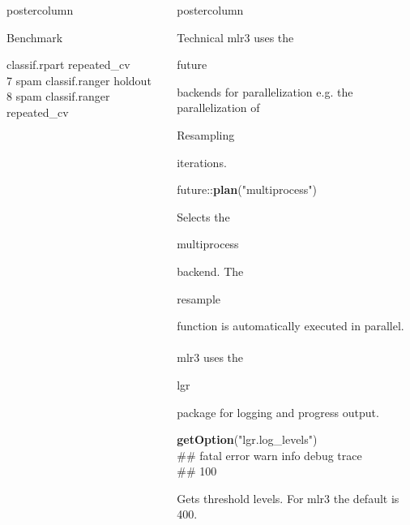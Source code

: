 \documentclass{beamer}
\newlength{\columnheight} %
\newcommand{\codeinline}[1]{\begin{codeboxinline}#1\end{codeboxinline}}
\begin{document}
\begin{withoutheader}
\begin{frame}[fragile]{}
\begin{columns}
\begin{column}{.245\textwidth}
\begin{beamercolorbox}[center]{postercolumn}
\begin{minipage}{.98\textwidth}
{\begin{myblock}{Benchmark}
\begin{codeboxmultiline}[width=27cm]
{								\space  classif.rpart
								\space\space repeated\_cv
								\space{}
								\space\space\space\space\space\space\space 0
								\space\space\space\space{}\\
								7 \space\space\space\space spam
								classif.ranger
								\space\space\space\space\space\space holdout
								\space\space\space\space 1
								\space\space\space\space\space\space{}
								\space\space\space\space\space 0\\
								8 \space\space\space\space spam
								classif.ranger
								\space\space repeated\_cv
								\space{}00
								\space\space\space\space\space\space{}
								\space\space\space\space{}
							}
						\end{codeboxmultiline}
					\end{myblock}
					\vfill
					}
				\end{minipage}
			\end{beamercolorbox}
		\end{column}
		\begin{column}{.245\textwidth}
			\begin{beamercolorbox}[center]{postercolumn}
				\begin{minipage}{.98\textwidth}
					\parbox[t][\columnheight]{\textwidth}{
						\begin{myblock}{Technical}
							{mlr3} uses the \codeinline{future} backends for parallelization e.g. the parallelization of \codeinline{Resampling} iterations.\\
							\begin{codebox}
								future::\textbf{plan}("multiprocess")
							\end{codebox}
							Selects the \codeinline{multiprocess} backend. The \codeinline{resample} function is automatically executed in parallel.
							\\
							\\
							{mlr3} uses the \codeinline{lgr} package for logging and progress output.
							\\
							\begin{codeboxmultiline}[width=23.1cm]
								\textbf{getOption}("lgr.log\_levels")\\
								\#\# fatal error  warn  info debug trace\\ 
								\#\# 100 \space{} \space{}  \space 500 \space\space 600
							\end{codeboxmultiline}
							Gets threshold levels. For {mlr3} the default is 400. 

\end{myblock}}
\end{minipage}
\end{beamercolorbox}
\end{column}
\end{columns}
\end{frame}
\end{withoutheader}
\end{document}
